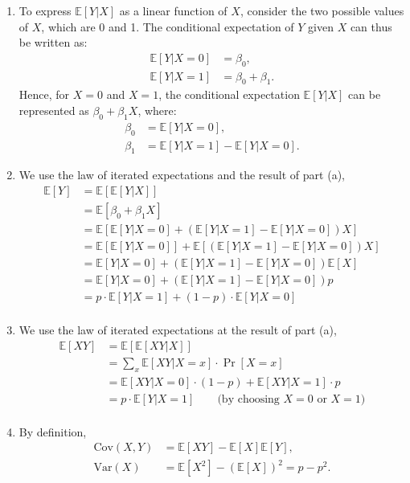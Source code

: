 \documentclass[10pt]{article}
\newcommand{\E}{\mathbb{E}}
\newenvironment{problem}[2][Problem]{\begin{trivlist}
\item[\hskip \labelsep {\bfseries #1}\hskip \labelsep {\bfseries #2.}]}{\end{trivlist}}
\begin{document}
\begin{problem}{4}`
    \hfill
    \begin{enumerate}
        \item
            To express \(\E[Y | X]\) as a linear function of \(X\), consider the two possible values of \(X\), which are 0 and 1. The conditional expectation of \(Y\) given \(X\) can thus be written as:
            \begin{align*}
            \E[Y | X = 0] &= \beta_0, \\
            \E[Y | X = 1] &= \beta_0 + \beta_1.
            \end{align*}
            Hence, for \(X = 0\) and \(X = 1\), the conditional expectation \(\E[Y | X]\) can be represented as \(\beta_0 + \beta_1X\), where:
            \begin{align*}
            \beta_0 &= \E[Y | X = 0], \\
            \beta_1 &= \E[Y | X = 1] - \E[Y | X = 0].
            \end{align*}

        \item
            We use the law of iterated expectations and the result of part (a),
            \begin{align*}
            \E[Y] &= \E[\E[Y | X]] \\
                  &= \E[\beta_0 + \beta_1X] \\
                  &= \E[\E[Y | X = 0] + (\E[Y | X = 1] - \E[Y | X = 0])X] \\
                  &= \E[\E[Y | X = 0]] + \E[(\E[Y | X = 1] - \E[Y | X = 0])X] \\
                  &= \E[Y | X = 0] + (\E[Y | X = 1] - \E[Y | X = 0])\E[X] \\
                  &= \E[Y | X = 0] + (\E[Y | X = 1] - \E[Y | X = 0])p \\
                  &= p \cdot \E[Y | X = 1] + (1 - p) \cdot \E[Y | X = 0] \\
            \end{align*}
        \item
            We use the law of iterated expectations at the result of part (a),
            \begin{align*}
                \E[XY] &= \E[\E[XY | X]] \\
                       &= \sum_{x} \E[XY | X = x] \cdot \Pr[X = x] \\
                       &= \E[XY | X = 0] \cdot (1-p) + \E[XY | X = 1] \cdot p \\
                       &= p \cdot \E[Y | X = 1] \qquad \text{(by choosing $X=0$ or $X=1$)} \\
            \end{align*}
        \item
            By definition,
            \begin{align*}
            \text{Cov}(X,Y) &= \E[XY] - \E[X]\E[Y], \\
            \text{Var}(X) &= \E[X^2] - (\E[X])^2 = p - p^2.
            \end{align*}


\end{enumerate}
\end{problem}
\end{document}
